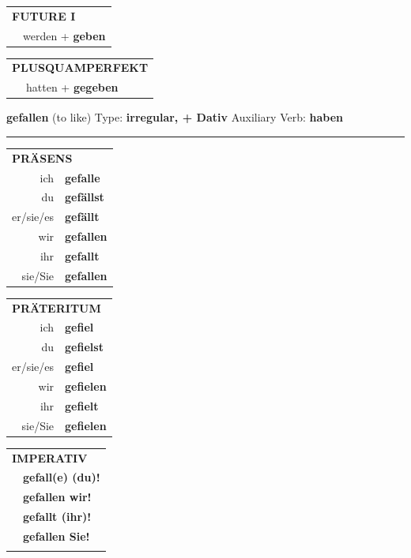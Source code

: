 \documentclass[10pt,a4paper]{revtex4-2}
\begin{document}
\begin{verbbox-dat}
\begin{tabular}{rl}
    \multicolumn{2}{l}{\textbf{FUTURE I} }\\
  &  werden + \textbf{geben}\\
 
  \end{tabular}
\hfill
   \begin{tabular}{rl}
      \multicolumn{2}{l}{\textbf{PLUSQUAMPERFEKT}}\\
  &  hatten + \textbf{gegeben}\\
  \end{tabular}
  
  \vspace{-5pt}


\end{verbbox-dat}
\begin{verbbox-dat}
    {\Large \bf gefallen} (to like) \hfill Type: \textbf{irregular, + Dativ} \hfill Auxiliary Verb: \textbf{haben} 
    
     \vspace{5pt}

    \hrule
    
    \vspace{5pt}

  \begin{tabular}{rl}
     \multicolumn{2}{l}{\textbf{PRÄSENS} }\\
    ich & \textbf{gefalle}\\
    du & \textbf{gefällst}\\
    er/sie/es & \textbf{gefällt}\\
    wir & \textbf{gefallen}\\
    ihr & \textbf{gefallt}\\
    sie/Sie & \textbf{gefallen}\\
  \end{tabular}
  \hfill
     \begin{tabular}{rl}
    \multicolumn{2}{l}{\textbf{PRÄTERITUM} }\\
    ich & \textbf{gefiel}\\
    du & \textbf{gefielst}\\
    er/sie/es & \textbf{gefiel}\\
    wir & \textbf{gefielen}\\
    ihr & \textbf{gefielt}\\
    sie/Sie & \textbf{gefielen}\\
  \end{tabular}
  \hfill
  \begin{tabular}{rl}
     \multicolumn{2}{l}{\textbf{IMPERATIV} }\\
   & \textbf{gefall(e) (du)!}\\
   & \textbf{gefallen wir!}\\
   & \textbf{gefallt (ihr)!}\\
   & \textbf{gefallen Sie!}\\
   & \vspace{10pt}
  \end{tabular}


\end{verbbox-dat}
\end{document}
